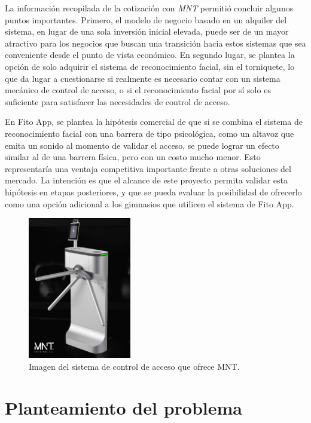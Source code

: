 La información recopilada de la cotización con \textit{MNT} permitió concluir algunos puntos importantes. Primero, el modelo de negocio basado en un alquiler del sistema, en lugar de una sola inversión inicial elevada, puede ser de un mayor atractivo para los negocios que buscan una transición hacia estos sistemas que sea conveniente desde el punto de vista económico. En segundo lugar, se plantea la opción de solo adquirir el sistema de reconocimiento facial, sin el torniquete, lo que da lugar a cuestionarse si realmente es necesario contar con un sistema mecánico de control de acceso, o si el reconocimiento facial por sí solo es suficiente para satisfacer las necesidades de control de acceso. 

En Fito App, se plantea la hipótesis comercial de que si se combina el sistema de reconocimiento facial con una barrera de tipo psicológica, como un altavoz que emita un sonido al momento de validar el acceso, se puede lograr un efecto similar al de una barrera física, pero con un costo mucho menor. Esto representaría una ventaja competitiva importante frente a otras soluciones del mercado. La intención es que el alcance de este proyecto permita validar esta hipótesis en etapas posteriores, y que se pueda evaluar la posibilidad de ofrecerlo como una opción adicional a los gimnasios que utilicen el sistema de Fito App. 


\begin{figure}[h!]
    \centering
    \includegraphics[width=0.4\textwidth]{fig/mnt.png}
    \caption{Imagen del sistema de control de acceso que ofrece MNT.}
    \label{fig:mnt_turnstile}
\end{figure}

\section{Planteamiento del problema}

